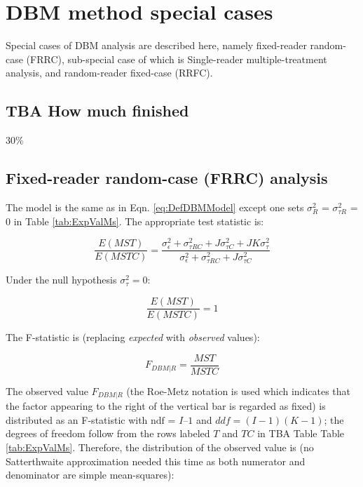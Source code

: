 \documentclass[
]{book}
\begin{document}
\hypertarget{dbm-analysis-special-cases}{%
\chapter{DBM method special cases}\label{dbm-analysis-special-cases}}

Special cases of DBM analysis are described here, namely fixed-reader random-case (FRRC), sub-special case of which is Single-reader multiple-treatment analysis, and random-reader fixed-case (RRFC).

\hypertarget{dbm-analysis-special-cases-fits-how-much-finished}{%
\section{TBA How much finished}\label{dbm-analysis-special-cases-fits-how-much-finished}}

30\%

\hypertarget{FRRCDBMAnalysis}{%
\section{Fixed-reader random-case (FRRC) analysis}\label{FRRCDBMAnalysis}}

The model is the same as in Eqn. \eqref{eq:DefDBMModel} except one sets \(\sigma_{R}^{2}\) = \(\sigma_{\tau R}^{2}\) = 0 in Table \ref{tab:ExpValMs}. The appropriate test statistic is:

\begin{equation}
\frac{E\left ( MST \right )}{E\left ( MSTC \right )} = \frac{\sigma_{\epsilon}^{2}+\sigma_{\tau RC}^{2}+J\sigma_{\tau C}^{2}+JK\sigma_{\tau}^{2}}{\sigma_{\epsilon}^{2}+\sigma_{\tau RC}^{2}+J\sigma_{\tau C}^{2}}
\end{equation}

Under the null hypothesis \(\sigma_{\tau}^{2} = 0\):

\begin{equation}
\frac{E\left ( MST \right )}{E\left ( MSTC \right )} = 1
\end{equation}

The F-statistic is (replacing \emph{expected} with \emph{observed} values):

\begin{equation}
F_{DBM|R}=\frac{MST}{MSTC}
\label{eq:FStatFRRC-DBM}
\end{equation}

The observed value \(F_{DBM|R}\) (the Roe-Metz notation \citep{RN1124} is used which indicates that the factor appearing to the right of the vertical bar is regarded as fixed) is distributed as an F-statistic with \(\text{ndf}\) = \(I – 1\) and \(ddf = (I-1)(K-1)\); the degrees of freedom follow from the rows labeled \(T\) and \(TC\) in TBA Table Table \ref{tab:ExpValMs}. Therefore, the distribution of the observed value is (no Satterthwaite approximation needed this time as both numerator and denominator are simple mean-squares):
\end{document}
